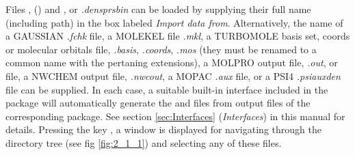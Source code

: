 \documentclass[10pt]{article}
\begin{document}
Files \ggbs{ }, (\sgbs) and \den{}, {\dengz{} or {\it .densprsbin}} can be loaded by 
supplying their full name (including path) in
the box labeled {\it Import data from}. Alternatively, the name of 
a GAUSSIAN\footnotemark{} {\it .fchk} file, a
MOLEKEL
file {\it .mkl}, a TURBOMOLE basis set, coords or molecular orbitals 
file, {\it .basis}, {\it .coords}, {\it .mos} (they must be renamed to a common name with 
the pertaning extensions), a MOLPRO output file, {\it .out}, or 
\xml{ } file, a NWCHEM output file, {\it .nwcout}, a MOPAC
{\it .aux} file, or a PSI4 {\it .psiauxden} file
can be supplied. In each case, a suitable built-in
interface
included in the package will automatically generate the \ggbs{ } and \den{ }
files from output files of the corresponding package. 
See section \ref{sec:Interfaces} ({\it Interfaces}) in this manual for details.
Pressing the key \teclapuntos, 
a window is displayed for navigating through the directory tree (see fig
\ref{fig:2_1_1}) and selecting any of these files.

\vspace*{5mm}
\end{document}
